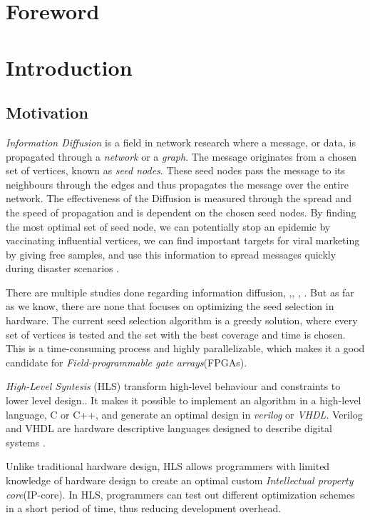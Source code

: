 \chapter{Foreword}
\chapter{Introduction} \label{intro}

\section{Motivation}
\textit{Information Diffusion} is a field in network research where a message, or data, is propagated through a \textit{network} or a \textit{graph}. The message originates from a chosen set of vertices, known as \textit{seed nodes}. These seed nodes pass the message to its neighbours through the edges and thus propagates the message over the entire network. The effectiveness of the Diffusion is measured through the spread and the speed of propagation and is dependent on the chosen seed nodes. By finding the most optimal set of seed node, we can potentially stop an epidemic by vaccinating influential vertices, we can find important targets for viral marketing by giving free samples, and use this information to spread messages quickly during disaster scenarios\cite{InformationDiffusionThroughBlogspace} \cite{Romero:2011:DMI:1963405.1963503}.

There are multiple studies done regarding information diffusion, \cite{InformationDiffusionThroughBlogspace},\cite{cha2010measuring},  \cite{5694014},  \cite{InfoDiffAndExternalInfluInNetworks}. But as far as we know, there are none that focuses on optimizing the seed selection in hardware. The current seed selection algorithm is a greedy solution\cite{greedyInfluenc2005}, where every set of vertices is tested and the set with the best coverage and time is chosen. This is a time-consuming process and highly parallelizable, which makes it a good candidate for \textit{Field-programmable gate arrays}(FPGAs). 

\textit{High-Level Syntesis} (HLS) transform high-level behaviour and constraints to lower level design.\cite{52214}. It makes it possible to implement an algorithm in a high-level language, C or C++, and generate an optimal design in \textit{verilog} or \textit{VHDL}. Verilog and VHDL are hardware descriptive languages designed to describe digital systems \cite{thomas2008verilog}. 

Unlike traditional hardware design, HLS allows programmers with limited knowledge of hardware design to create an optimal custom \textit{Intellectual property core}(IP-core). In HLS, programmers can test out different optimization schemes in a short period of time, thus reducing development overhead.  

